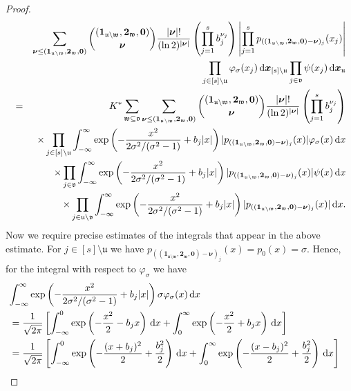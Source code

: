 \documentclass[namedate,webpdf,imanum]{ima-authoring-arxiv}%
\theoremstyle{thmstyletwo}%
\numberwithin{equation}{section}
\newcommand{\rd}{\, {\rm d}}
\newcommand{\bsx}{\boldsymbol{x}}
\newcommand{\bsnu}{\boldsymbol{\nu}}
\newcommand{\bszero}{\boldsymbol{0}}
\newcommand{\bsone}{\boldsymbol{1}}
\newcommand{\bstwo}{\boldsymbol{2}}
\newcommand{\uu}{\mathfrak{u}}
\newcommand{\vv}{\mathfrak{v}}
\newcommand{\ww}{\mathfrak{w}}
\begin{document}
\begin{proof}
\begin{eqnarray*}
& & \sum_{\bsnu \le (\bsone_{\uu \setminus \ww},\bstwo_{\ww},\bszero)} {(\bsone_{\uu \setminus \ww},\bstwo_{\ww},\bszero) \choose \bsnu} \frac{|\bsnu|!}{(\ln 2)^{|\bsnu|}} \left(\prod_{j=1}^s b_j^{\nu_j}\right)  \left| \prod_{j=1}^s p_{((\bsone_{\uu \setminus \ww},\bstwo_{\ww},\bszero) -\bsnu)_j}(x_j)\right| \\
& & \prod_{j \in [s]\setminus \uu} \varphi_{\sigma}(x_j) \rd \bsx_{[s] \setminus \uu}   \prod_{j \in \vv} \psi(x_j)     \rd \bsx_{\uu}\\
& = & K^{\ast} \sum_{\ww \subseteq \vv} \sum_{\bsnu \le (\bsone_{\uu \setminus \ww},\bstwo_{\ww},\bszero)} {(\bsone_{\uu \setminus \ww},\bstwo_{\ww},\bszero) \choose \bsnu} \frac{|\bsnu|!}{(\ln 2)^{|\bsnu|}} \left(\prod_{j=1}^s b_j^{\nu_j}\right) \\
&& \times  \prod_{j \in [s]\setminus \uu} \int_{-\infty}^{\infty} \exp\left(-\frac{x^2}{2 \sigma^2/(\sigma^2-1)} +b_j|x|\right) |p_{((\bsone_{\uu \setminus \ww},\bstwo_{\ww},\bszero) -\bsnu)_j}(x)| \varphi_{\sigma}(x) \rd x \\
&& \times \prod_{j \in \vv} \int_{-\infty}^{\infty} \exp\left(-\frac{x^2}{2 \sigma^2/(\sigma^2-1)} +b_j|x|\right) |p_{((\bsone_{\uu \setminus \ww},\bstwo_{\ww},\bszero) -\bsnu)_j}(x)| \psi(x) \rd x \\
&& \times \prod_{j \in \uu \setminus\vv} \int_{-\infty}^{\infty} \exp\left(-\frac{x^2}{2 \sigma^2/(\sigma^2-1)} +b_j|x|\right) |p_{((\bsone_{\uu \setminus \ww},\bstwo_{\ww},\bszero) -\bsnu)_j}(x)|  \rd x.
\end{eqnarray*}
Now we require precise estimates of the integrals that appear in the above estimate. For $j \in [s]\setminus \uu$ we have $p_{((\bsone_{\uu \setminus \ww},\bstwo_{\ww},\bszero) -\bsnu)_j}(x)=p_0(x)=\sigma$. Hence, for the integral with respect to $\varphi_\sigma$ we have 
\begin{align}\label{est:int1}
\lefteqn{\int_{-\infty}^{\infty} \exp\left(-\frac{x^2}{2 \sigma^2/(\sigma^2-1)} +b_j|x|\right) \sigma \varphi_{\sigma}(x) \,\mathrm{d} x}\nonumber\\
&= \frac{1}{\sqrt{2 \pi}} \left[\int_{-\infty}^0 \exp\left(- \frac{x^2}{2} - b_j x\right)  \,\mathrm{d} x +  \int_0^{\infty} \exp\left(-\frac{x^2}{2} +b_j x\right) \,\mathrm{d} x \right]\nonumber\\
&= \frac{1}{\sqrt{2 \pi}} \left[\int_{-\infty}^0 \exp\left(-\frac{(x+b_j)^2}{2} + \frac{b_j^2}{2} \right)  \,\mathrm{d} x +\int_0^{\infty} \exp\left(-\frac{(x-b_j)^2}{2} + \frac{b_j^2}{2} \right)  \,\mathrm{d} x \right]\nonumber\\

\end{align}
\end{proof}
\end{document}
